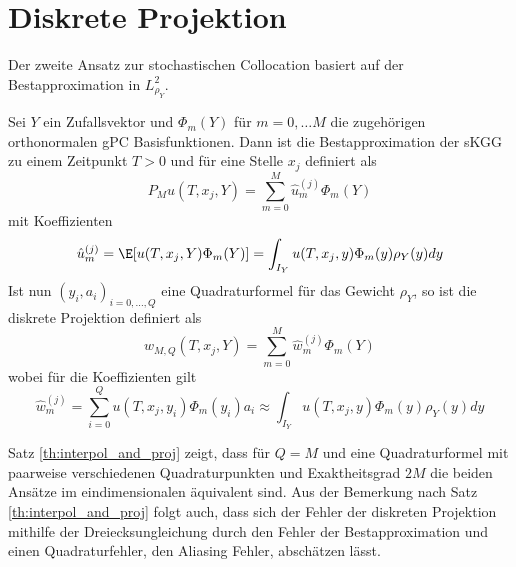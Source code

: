 \section{Diskrete Projektion}
Der zweite Ansatz zur stochastischen Collocation basiert auf der Bestapproximation in $L_{\rho_Y}^2$.
\begin{mathdef}
Sei $Y$ ein Zufallsvektor und $\Phi_m(Y)$ für $m=0,\dots M$ die zugehörigen orthonormalen gPC Basisfunktionen. Dann ist die Bestapproximation der sKGG zu einem Zeitpunkt $T>0$ und für eine Stelle $x_j$ definiert als
\[P_Mu(T,x_j,Y)=\sum_{m=0}^M\hat{u}_m^{(j)}\Phi_m(Y)\]
mit Koeffizienten
\[\hat{u}_m^{(j)}=\E[u(T,x_j,Y)\Phi_m(Y)]=\int_{I_Y} u(T,x_j,y)\Phi_m(y)\rho_Y(y)dy\]
Ist nun $(y_i,a_i)_{i=0,\dots,Q}$ eine Quadraturformel für das Gewicht $\rho_Y$, so ist die diskrete Projektion definiert als
\[w_{M,Q}(T,x_j,Y)=\sum_{m=0}^M\hat{w}_m^{(j)}\Phi_m(Y)\] wobei für die Koeffizienten gilt
\[\hat{w}_m^{(j)}=\sum_{i=0}^Qu(T,x_j,y_i)\Phi_m(y_i)a_i\approx \int_{I_Y} u(T,x_j,y)\Phi_m(y)\rho_Y(y)dy\]
\end{mathdef}
Satz \ref{th:interpol_and_proj} zeigt, dass für $Q=M$ und eine Quadraturformel mit paarweise verschiedenen Quadraturpunkten und Exaktheitsgrad $2M$ die beiden Ansätze im eindimensionalen äquivalent sind. Aus der Bemerkung nach Satz \ref{th:interpol_and_proj} folgt auch, dass sich der Fehler der diskreten Projektion mithilfe der Dreiecksungleichung durch den Fehler der Bestapproximation und einen Quadraturfehler, den Aliasing Fehler, abschätzen lässt.


